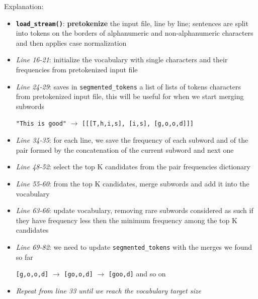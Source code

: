 \documentclass[12pt]{article}
\begin{document}
Explanation:
\begin{itemize}
    \item \textbf{\texttt{load\_stream()}}: \textbf{pretokenize} the input file, line by line; sentences are split into tokens on the borders of alphanumeric and non-alphanumeric characters and then applies case normalization
    
    \item \textit{Line 16-21}: initialize the vocabulary with single characters and their frequencies from pretokenized input file

    \item \textit{Line 24-29}: saves in \texttt{segmented\_tokens} a list of lists of tokens characters from pretokenized input file, this will be useful for when we start merging subwords 
    
    {\centering
    \texttt{"This is good"} $\rightarrow$ \texttt{[[[T,h,i,s], [i,s], [g,o,o,d]]]}
    \par}

    \item \textit{Line 34-35}: for each line, we save the frequency of each subword and of the pair formed by the concatenation of the current subword and next one

    \item \textit{Line 48-52}: select the top K candidates from the pair frequencies dictionary

    \item \textit{Line 55-60}: from the top K candidates, merge subwords and add it into the vocabulary

    \item \textit{Line 63-66}: update vocabulary, removing rare subwords considered as such if they have frequency less then the minimum frequency among the top K candidates

    \item \textit{Line 69-82}: we need to update \texttt{segmented\_tokens} with the merges we found so far

    {\centering
    \texttt{[g,o,o,d]} $\rightarrow$ \texttt{[go,o,d]} $\rightarrow$ \texttt{[goo,d]} and so on
    \par}

    \item \textit{Repeat from line 33 until we reach the vocabulary target size}
\end{itemize}
\end{document}
